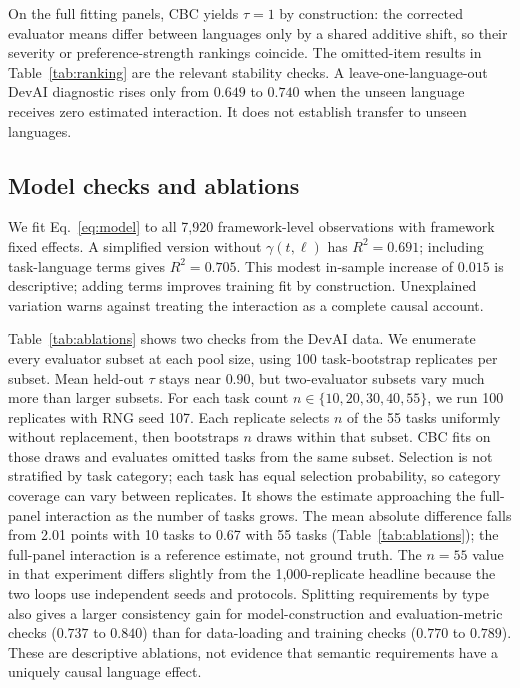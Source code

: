 \documentclass[sigconf,anonymous]{aamas}
\begin{document}
On the full fitting panels, CBC yields $\tau=1$ by construction:
the corrected evaluator means differ between languages only by a shared
additive shift, so their severity or preference-strength rankings coincide.
The omitted-item results in
Table~\ref{tab:ranking} are the relevant stability checks.
A leave-one-language-out DevAI diagnostic rises only from $0.649$ to
$0.740$ when the unseen language receives zero estimated interaction.
It does not establish transfer to unseen languages.

\subsection{Model checks and ablations}
We fit Eq.~\ref{eq:model} to all 7{,}920 framework-level observations
with framework fixed effects. A simplified version without
$\gamma(t,\ell)$ has $R^2=0.691$; including task-language terms gives
$R^2=0.705$. This modest in-sample increase of $0.015$ is descriptive;
adding terms improves training fit by construction. Unexplained variation
warns against treating the interaction as a complete causal account.

Table~\ref{tab:ablations} shows two checks from the DevAI data.
We enumerate every evaluator subset at each pool size, using 100
task-bootstrap replicates per subset. Mean held-out $\tau$ stays near
$0.90$, but two-evaluator subsets vary much more than larger subsets.
For each task count $n\in\{10,20,30,40,55\}$, we run 100 replicates
with RNG seed 107. Each replicate selects $n$ of the 55 tasks uniformly
without replacement, then bootstraps $n$ draws within that subset.
CBC fits on those draws and evaluates omitted tasks from the same subset.
Selection is not stratified by task category; each task has equal selection
probability, so category coverage can vary between replicates.
It shows the estimate
approaching the full-panel interaction as the number of tasks grows.
The mean absolute difference falls from 2.01 points with 10 tasks to
0.67 with 55 tasks (Table~\ref{tab:ablations}); the full-panel interaction
is a reference estimate, not ground truth. The $n=55$
value in that experiment differs slightly from the 1,000-replicate
headline because the two loops use independent seeds and protocols.
Splitting requirements by type also gives a larger consistency gain
for model-construction and evaluation-metric checks ($0.737$ to $0.840$)
than for data-loading and training checks ($0.770$ to $0.789$).
These are descriptive ablations, not evidence
that semantic requirements have a uniquely causal language effect.
\end{document}
